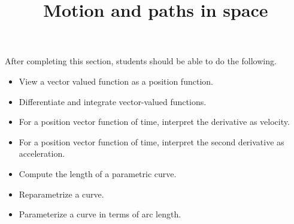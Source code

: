 \documentclass{ximera}
\title{Motion and paths in space}
\begin{document}
\begin{abstract}
\end{abstract}

\maketitle

\begin{sectionOutcomes}

After completing this section, students should be able to do the following.

\begin{itemize}
\item View a vector valued function as a position function.
\item Differentiate and integrate vector-valued functions.
\item For a position vector function of time, interpret
  the derivative as velocity.
\item For a position vector function of time, interpret the second
  derivative as acceleration.
\item Compute the length of a parametric curve.
\item Reparametrize a curve.
\item Parameterize a curve in terms of arc length.
\end{itemize}

\end{sectionOutcomes}
\end{document}
